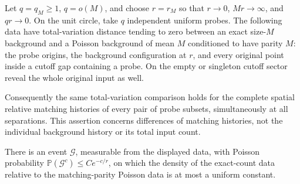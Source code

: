 \documentclass[11pt,letterpaper]{article}
\newcommand{\PP}{\mathbb P}\newcommand{\EE}{\mathbb E}
\begin{document}
\begin{lemma}
\label{lem:relative-history-depoisson}
Let $q=q_M\ge1$, $q=o(M)$, and choose $r=r_M$ so that
$r\to0$, $Mr\to\infty$, and $qr\to0$.
On the unit circle, take $q$ independent uniform probes.
The following data have total-variation distance tending to
zero between an exact size-$M$ background and a Poisson
background of mean $M$ conditioned to have parity $M$:
the probe origins, the background configuration at $r$, and
every original point inside a cutoff gap containing a probe.
On the empty or singleton cutoff sector reveal the whole
original input as well.

Consequently the same total-variation comparison holds for
the complete spatial relative matching histories of every
pair of probe subsets, simultaneously at all separations.
This assertion concerns differences of matching histories,
not the individual background history or its total input count.

There is an event $\mathcal G$, measurable from the displayed
data, with Poisson probability
$\PP(\mathcal G^c)\le Ce^{-c/r}$, on which the density of the
exact-count data relative to the matching-parity Poisson data
is at most a uniform constant.
\end{lemma}
\end{document}
